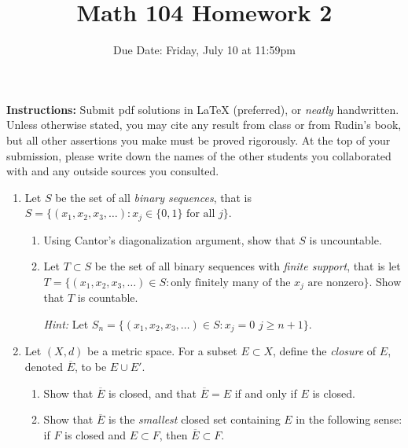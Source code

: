 \documentclass[12pt, letterpaper]{article}
\title{Math 104 Homework 2}
\author{Due Date: Friday, July 10 at 11:59pm}
\date{}
\newcommand{\0}{\mathbf{0}}
\newcommand{\1}{\mathbf{1}}
\begin{document}
\maketitle

\noindent\textbf{Instructions:} Submit pdf solutions in LaTeX (preferred), or \textit{neatly} handwritten. 
Unless otherwise stated, you may cite any result from class or from Rudin's book, but all other assertions you make must be proved rigorously. At the top of your submission, please write down the names of the other students you collaborated with and any outside sources you consulted.

\vspace{0.5cm}

\begin{enumerate}
    \item 
    Let $S$ be the set of all \textit{binary sequences}, that is $S = \{(x_1, x_2, x_3, \dots ) : x_j \in \{0, 1\} \text{ for all } j\}$. 
    \begin{enumerate}
        \item 
        Using Cantor's diagonalization argument, show that $S$ is uncountable.

        \item 
        Let $T \subset S$ be the set of all binary sequences with \textit{finite support}, that is let $T = \{(x_1, x_2, x_3, \dots) \in S : \text{only finitely many of the $x_j$ are nonzero}\}.$ Show that $T$ is countable.
        
        \textit{Hint:} Let $S_n = \{(x_1, x_2, x_3, \dots ) \in S : x_j = 0$  $j \geq n + 1\}$.
        
    \end{enumerate}

    \vspace{0.5cm}

    \item 
    Let $(X, d)$ be a metric space. For a subset $E \subset X$, define the \textit{closure} of $E$, denoted $\overline{E}$, to be $E \cup E'$.
    \begin{enumerate}
        \item 
        Show that $\overline{E}$ is closed, and that $\overline{E} = E$ if and only if $E$ is closed.

        \item 
        Show that $\overline{E}$ is the \textit{smallest} closed set containing $E$ in the following sense: if $F$ is closed and $E \subset F$, then $\overline{E} \subset F$.


\end{enumerate}
\end{enumerate}
\end{document}
